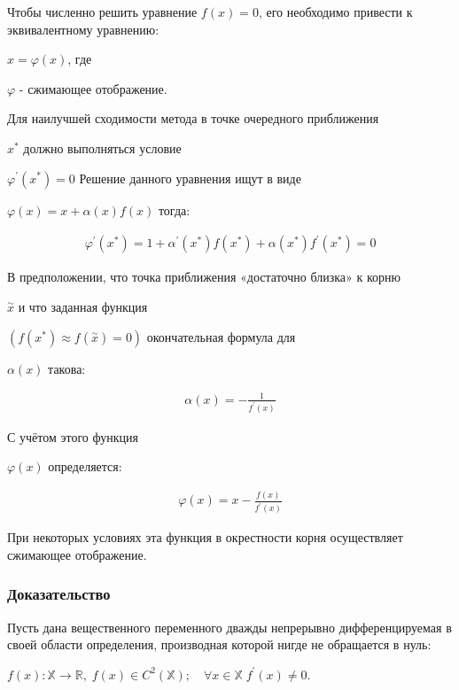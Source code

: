 \documentclass[a4paper]{article}
\begin{document}
Чтобы численно решить уравнение {\(f(x) = 0\)}, его необходимо привести к эквивалентному уравнению:
{{\(x = \varphi(x)\)}, где {{\(\varphi\)} - сжимающее отображение.

Для наилучшей сходимости метода в точке очередного приближения {{\(x^{\ast}\)} должно выполняться условие
{{\(\varphi^{\prime}(x^{\ast}) = 0\)} Решение данного уравнения ищут в виде {{\(\varphi(x) = x + \alpha(x)f(x)\)} тогда:

\begin{equation}
\label{eqn:2.1}
    \begin{aligned}
            \varphi^{\prime}(x^{*})=1+\stackrel{}{\alpha^{\prime}}(x^{*})f(x^{*})+\alpha(x^{*})f^{\prime}(x^{*})=0
    \end{aligned}
\end{equation}

В предположении, что точка приближения «достаточно близка» к корню
{{\(\overset{\sim}{x}\)} и что заданная функция
{{\((f(x^{\ast}) \approx f(\overset{\sim}{x}) = 0)\)}
окончательная формула для
{{\(\alpha(x)\)}
такова:

\begin{equation}
\label{eqn:2.1}
    \begin{aligned}
            \alpha(x)=-{\frac{1}{f^{\prime}(x)}}
    \end{aligned}
\end{equation}

С учётом этого функция {{\(\varphi(x)\)} определяется:

\begin{equation}
\label{eqn:2.1}
    \begin{aligned}
            \varphi(x)=x-{\frac{f(x)}{f^{\prime}(x)}}
    \end{aligned}
\end{equation}

При некоторых условиях эта функция в окрестности корня осуществляет
сжимающее отображение.

\subsubsection{Доказательство}

Пусть дана вещественного переменного дважды непрерывно дифференцируемая в своей области
определения, производная которой нигде не обращается в нуль:

\begin{center}
 {{\(f(x):\mathbb{X}\rightarrow\mathbb{R},\; f(x) \in C^{2}(\mathbb{X});\quad\forall x \in \mathbb{X}\; f^{\prime}(x) \neq 0.\)}}
\end{center}

}}}}}}}}}
\end{document}
